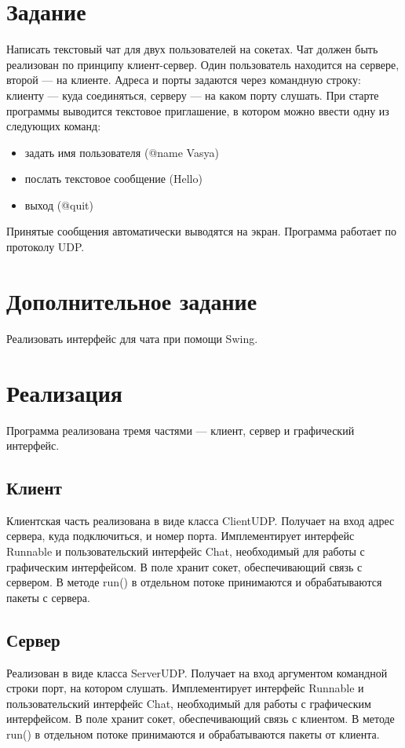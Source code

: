 \documentclass{article}
\begin{document}
\section{Задание}
Написать текстовый чат для двух пользователей на сокетах. Чат должен быть реализован по принципу клиент-сервер. Один пользователь находится на сервере, второй --- на клиенте. Адреса и порты задаются через командную строку: клиенту --- куда соединяться, серверу --- на каком порту слушать. При старте программы выводится текстовое приглашение, в котором можно ввести одну из следующих команд:
\begin{itemize}
	\item задать имя пользователя (@name Vasya)

	\item послать текстовое сообщение (Hello)

	\item выход (@quit)
\end{itemize}

Принятые сообщения автоматически выводятся на экран. Программа работает по протоколу UDP.

\section{Дополнительное задание}
Реализовать интерфейс для чата при помощи Swing.

\section{Реализация}
Программа реализована тремя частями --- клиент, сервер и графический интерфейс.

\subsection{Клиент}
Клиентская часть реализована в виде класса ClientUDP. Получает на вход адрес сервера, куда подключиться, и номер порта. Имплементирует интерфейс Runnable и пользовательский интерфейс Chat, необходимый для работы с графическим интерфейсом. В поле хранит сокет, обеспечивающий связь с сервером. В методе run() в отдельном потоке принимаются и обрабатываются пакеты с сервера. 

\subsection{Сервер}
Реализован в виде класса ServerUDP. Получает на вход аргументом командной строки порт, на котором слушать. Имплементирует интерфейс Runnable и пользовательский интерфейс Chat, необходимый для работы с графическим интерфейсом. В поле хранит сокет, обеспечивающий связь с клиентом. В методе run() в отдельном потоке принимаются и обрабатываются пакеты от клиента.
\end{document}
